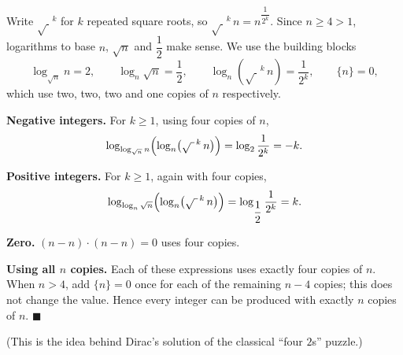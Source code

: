 Write $\sqrt{\ }^{\,k}$ for $k$ repeated square roots, so $\sqrt{\ }^{\,k}\,n=n^{\dfrac{1}{2^k}}$. Since $n\ge4>1$, logarithms to base $n$, $\sqrt n$ and $\dfrac{1}{2}$ make sense. We use the building blocks
\[
\log_{\sqrt n}n=2,\qquad \log_n\sqrt n=\dfrac{1}{2},\qquad \log_n\left(\sqrt{\ }^{\,k}\,n\right)=\dfrac{1}{2^k},\qquad \{n\}=0,
\]
which use two, two, two and one copies of $n$ respectively.

\textbf{Negative integers.} For $k\ge1$, using four copies of $n$,
\[
\log_{\log_{\sqrt n}n}\Bigl(\log_n\bigl(\sqrt{\ }^{\,k}\,n\bigr)\Bigr)=\log_2\dfrac{1}{2^k}=-k .
\]

\textbf{Positive integers.} For $k\ge1$, again with four copies,
\[
\log_{\log_n\sqrt n}\Bigl(\log_n\bigl(\sqrt{\ }^{\,k}\,n\bigr)\Bigr)=\log_{\dfrac{1}{2}}\dfrac{1}{2^k}=k .
\]

\textbf{Zero.} $(n-n)\cdot(n-n)=0$ uses four copies.

\textbf{Using all $n$ copies.} Each of these expressions uses exactly four copies of $n$. When $n>4$, add $\{n\}=0$ once for each of the remaining $n-4$ copies; this does not change the value. Hence every integer can be produced with exactly $n$ copies of $n$. $\blacksquare$

(This is the idea behind Dirac's solution of the classical ``four $2$s'' puzzle.)
